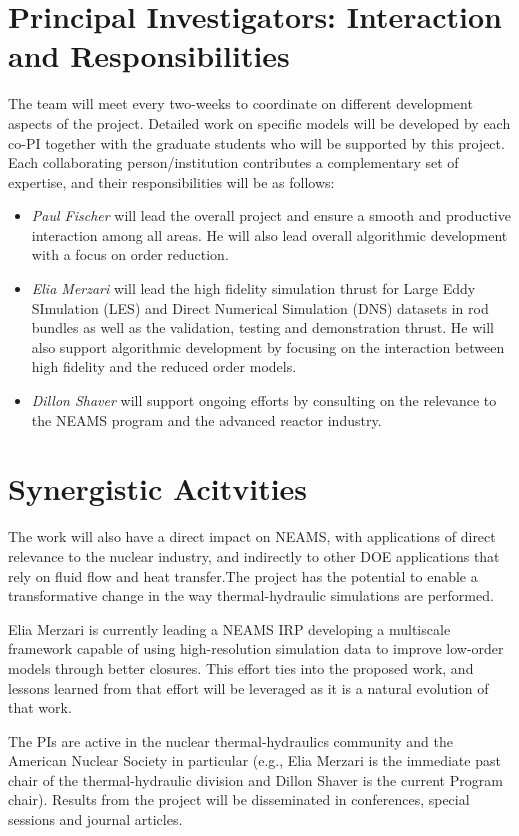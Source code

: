 \section{Principal Investigators: Interaction and Responsibilities}
The team will meet every two-weeks to coordinate on different development aspects of the project. Detailed work on specific models will be developed by each co-PI together with the graduate students who will be supported by this project. Each collaborating person/institution contributes a complementary set of expertise, and their responsibilities will be as follows:
\begin{itemize}
    \item \textit{Paul  Fischer} will  lead the overall project and ensure a smooth and productive interaction among all areas. He will also lead overall algorithmic development with a focus on order reduction.
    \item \textit{Elia  Merzari} will lead the high fidelity simulation thrust for Large Eddy SImulation (LES) and Direct Numerical Simulation (DNS) datasets in rod bundles as well as the validation, testing and demonstration thrust. He will also support algorithmic development by focusing on the interaction between high fidelity and the reduced order models.
    \item \textit{Dillon Shaver} will support ongoing efforts by consulting on the relevance to the NEAMS program and the advanced reactor industry.
\end{itemize}
\section{Synergistic Acitvities}
The work will also have a direct impact on NEAMS, with applications of direct relevance to the nuclear industry, and indirectly to other DOE applications that rely on fluid flow and heat transfer.The project has the potential to enable a transformative change in the way thermal-hydraulic simulations are performed.

Elia Merzari is currently leading a NEAMS IRP developing a multiscale framework capable of using high-resolution simulation data to improve low-order models through better closures. This effort ties into the proposed work, and lessons learned from that effort will be leveraged as it is a natural evolution of that work.

The PIs are active in the nuclear thermal-hydraulics community and the American Nuclear Society in particular (e.g., Elia Merzari is the immediate past chair of the thermal-hydraulic division and Dillon Shaver is the current Program chair). Results from the project will be disseminated in conferences, special sessions and journal articles.


